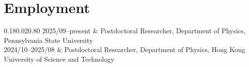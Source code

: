 \section{Employment}

\begin{EntriesTable}{0.18}{0.02}{0.80}
2025/09--present & Postdoctoral Researcher, Department of Physics, Pennsylvania State University \\
2024/10--2025/08 & Postdoctoral Researcher, Department of Physics, Hong Kong University of Science and Technology \\
\end{EntriesTable}
